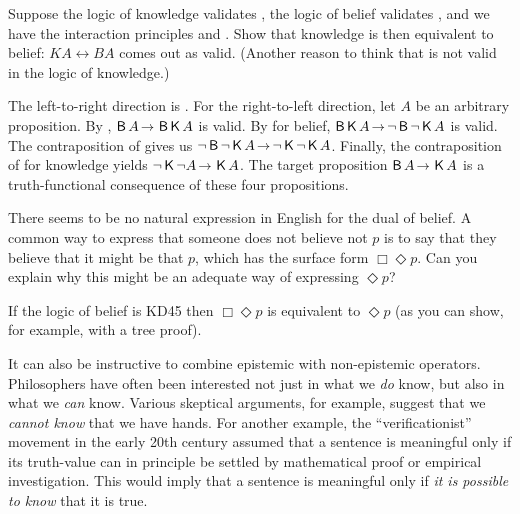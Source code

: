 \begin{exercise}
  Suppose the logic of knowledge validates , the logic of belief validates
  , and we have the interaction principles  and . Show that
  knowledge is then equivalent to belief: $KA \leftrightarrow BA$ comes out as
  valid. (Another reason to think that  is not valid in the logic of
  knowledge.)
\end{exercise}
\begin{solution}
  The left-to-right direction is . For the right-to-left direction, let
  $A$ be an arbitrary proposition. By , $\Bel A \to \Bel\Kn A$ is valid.
  By  for belief, $\Bel \Kn A \to \neg\Bel \neg \Kn A$ is valid. The
  contraposition of  gives us
  $\neg \Bel \neg \Kn A \to \neg\Kn\neg\Kn A$. Finally, the contraposition of
   for knowledge yields $\neg \Kn\neg A \to \Kn A$. The target proposition
  $\Bel A \to \Kn A$ is a truth-functional consequence of these four
  propositions.
\end{solution}


\begin{exercise}
  There seems to be no natural expression in English for the dual of belief. A
  common way to express that someone does not believe not $p$ is to say that
  they believe that it might be that $p$, which has the surface form
  $\Box\Diamond p$. Can you explain why this might be an adequate way of expressing $\Diamond p$?
\end{exercise}
\begin{solution}
  If the logic of belief is KD45 then $\Box\Diamond p$ is equivalent to
  $\Diamond p$ (as you can show, for example, with a tree proof).
\end{solution}

It can also be instructive to combine epistemic with non-epistemic operators.
Phi\-losophers have often been interested not just in what we \emph{do} know, but
also in what we \emph{can} know. Various skeptical arguments, for example,
suggest that we \emph{cannot know} that we have hands. For another example, the
``verificationist'' movement in the early 20th century assumed that a sentence
is meaningful only if its truth-value can in principle be settled by
mathematical proof or empirical investigation. This would imply that a sentence
is meaningful only if \emph{it is possible to know} that it is true.

